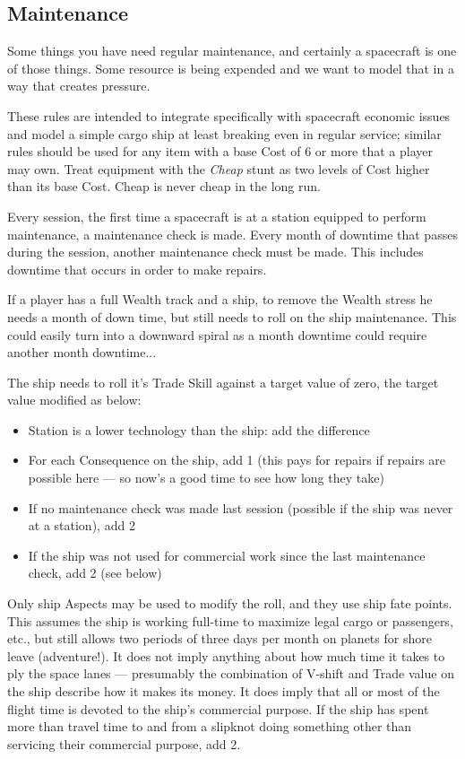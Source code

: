 \subsection{Maintenance}\label{sec:Maintenance} %

Some things you have need regular maintenance, and certainly a spacecraft is one of those things. Some resource is being expended and we want to model that in a way that creates pressure.

These rules are intended to integrate specifically with spacecraft economic issues and model a simple cargo ship at least breaking even in regular service; similar rules should be used for any item with a base Cost of 6 or more that a player may own. Treat equipment with the \emph{Cheap} stunt as two levels of Cost higher than its base Cost. Cheap is never cheap in the long run.

Every session, the first time a spacecraft is at a station equipped to perform maintenance, a maintenance check is made. Every month of downtime that passes during the session, another maintenance check must be made. This includes downtime that occurs in order to make repairs.

If a player has a full Wealth track and a ship, to remove the Wealth stress he needs a month of down time, but still needs to roll on the ship maintenance. This could easily turn into a downward spiral as a month downtime could require another month downtime...

The ship needs to roll it's Trade Skill against a target value of zero, the target value modified as below:

\begin{itemize}
\item Station is a lower technology than the ship: add the difference

\item For each Consequence on the ship, add 1 (this pays for repairs if repairs are possible here --- so now's a good time to see how long they take)

\item If no maintenance check was made last session (possible if the ship was never at a station), add 2

\item If the ship was not used for commercial work since the last maintenance check, add 2 (see below)
\end{itemize}

Only ship Aspects may be used to modify the roll, and they use ship fate points. This assumes the ship is working full-time to maximize legal cargo or passengers, etc., but still allows two periods of three days per month on planets for shore leave (adventure!). It does not imply anything about how much time it takes to ply the space lanes --- presumably the combination of V-shift and Trade value on the ship describe how it makes its money. It does imply that all or most of the flight time is devoted to the ship's commercial purpose. If the ship has spent more than travel time to and from a slipknot doing something other than servicing their commercial purpose, add 2.

